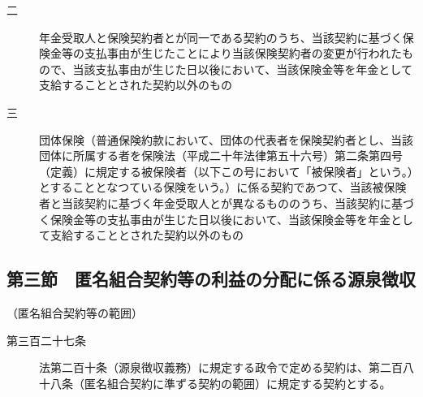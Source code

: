 \documentclass[twocolumn,a4j,10pt]{ltjtarticle}
\begin{document}
\begin{description}
\begin{description}
\item[二]年金受取人と保険契約者とが同一である契約のうち、当該契約に基づく保険金等の支払事由が生じたことにより当該保険契約者の変更が行われたもので、当該支払事由が生じた日以後において、当該保険金等を年金として支給することとされた契約以外のもの
\item[三]団体保険（普通保険約款において、団体の代表者を保険契約者とし、当該団体に所属する者を保険法（平成二十年法律第五十六号）第二条第四号（定義）に規定する被保険者（以下この号において「被保険者」という。）とすることとなつている保険をいう。）に係る契約であつて、当該被保険者と当該契約に基づく年金受取人とが異なるもののうち、当該契約に基づく保険金等の支払事由が生じた日以後において、当該保険金等を年金として支給することとされた契約以外のもの
\end{description}
\end{description}
\subsection*{第三節　匿名組合契約等の利益の分配に係る源泉徴収}
\noindent\hspace{10pt}（匿名組合契約等の範囲）
\begin{description}
\item[第三百二十七条]法第二百十条（源泉徴収義務）に規定する政令で定める契約は、第二百八十八条（匿名組合契約に準ずる契約の範囲）に規定する契約とする。
\end{description}
\end{document}
